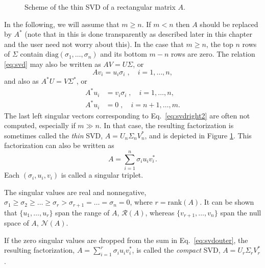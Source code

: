\begin{figure}
\centering
{}
\caption{\label{fig:svd}Scheme of the thin SVD of a rectangular matrix $A$.}
\end{figure}

In the following, we will assume that $m\geq n$. If $m<n$ then $A$ should be replaced by $A^*$ (note that in \slepc this is done transparently as described later in this chapter and the user need not worry about this). In the case that $m\geq n$, the top $n$ rows of $\Sigma$ contain $\mathrm{diag}(\sigma_1,\ldots,\sigma_n)$ and its bottom $m-n$ rows are zero. The relation \ref{eq:svd} may also be written as $AV=U\Sigma$, or
\begin{equation}
\label{eq:svdleft}
Av_i=u_i\sigma_i\;,\quad i=1,\ldots,n,
\end{equation}
and also as $A^*U=V\Sigma^*$, or
\begin{align}
\label{eq:svdright}
A^*u_i&=v_i\sigma_i\;,\quad i=1,\ldots,n,\\
\label{eq:svdright2}
A^*u_i&=0\;,\quad i=n+1,\ldots,m.
\end{align}
The last left singular vectors corresponding to Eq.\ \ref{eq:svdright2} are often not computed, especially if $m\gg n$. In that case, the resulting factorization is sometimes called the \emph{thin} SVD, $A=U_n\Sigma_n V_n^*$, and is depicted in Figure \ref{fig:svd}. This factorization can also be written as
\begin{equation}
\label{eq:svdouter}
A=\sum_{i=1}^{n}\sigma_iu_iv_i^*.
\end{equation}
Each $(\sigma_i,u_i,v_i)$ is called a singular triplet.

The singular values are real and nonnegative, $\sigma_1\geq\sigma_2\geq\ldots\geq\sigma_r>\sigma_{r+1}=\ldots=\sigma_n=0$, where $r=\mathrm{rank}(A)$. It can be shown that $\{u_1,\ldots,u_r\}$ span the range of $A$, $\mathcal{R}(A)$, whereas $\{v_{r+1},\ldots,v_n\}$ span the null space of $A$, $\mathcal{N}(A)$.

If the zero singular values are dropped from the sum in Eq.\ \ref{eq:svdouter}, the resulting factorization, $A=\sum_{i=1}^{r}\sigma_iu_iv_i^*$, is called the \emph{compact} SVD, $A=U_r\Sigma_r V_r^*$.

